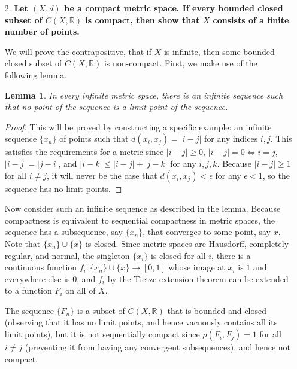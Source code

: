 \documentclass[a4paper,12pt]{article}
\newtheorem{lemma}[theorem]{Lemma}
\begin{document}
\begin{enumerate}
    \item[2.]
        \boldmath\textbf{Let $(X, d)$ be a compact metric space. If every bounded closed subset of $C(X, \mathbb{R})$ is compact, then show that $X$ consists of a finite number of points.
        }\unboldmath \par
        We will prove the contrapositive, that if $X$ is infinite, then some bounded closed subset of $C(X, \mathbb{R})$ is non-compact. First, we make use of the following lemma.
        \begin{lemma}
            In every infinite metric space, there is an infinite sequence such that no point of the sequence is a limit point of the sequence.
        \end{lemma}
        \begin{proof}
            This will be proved by constructing a specific example: an infinite sequence $\{ x_n \}$ of points such that $d(x_i, x_j) = |i - j|$ for any indices $i, j$. This satisfies the requirements for a metric since $|i - j| \geq 0$, $|i - j| = 0 \Leftrightarrow i = j$, $|i - j| = |j - i|$, and $|i - k| \leq |i - j| + |j - k|$ for any $i, j, k$. Because $|i - j| \geq 1$ for all $i \neq j$, it will never be the case that $d(x_i, x_j) < \epsilon$ for any $\epsilon < 1$, so the sequence has no limit points.
        \end{proof}
        Now consider such an infinite sequence as described in the lemma. Because compactness is equivalent to sequential compactness in metric spaces, the sequence has a subsequence, say $\{x_n\}$, that converges to some point, say $x$. Note that $\{x_n\} \cup \{x\}$ is closed. Since metric spaces are Hausdorff, completely regular, and normal, the singleton $\{x_i\}$ is closed for all $i$, there is a continuous function $f_i : \{x_n\} \cup \{x\} \to [0, 1]$ whose image at $x_i$ is $1$ and everywhere else is $0$, and $f_i$ by the Tietze extension theorem can be extended to a function $F_i$ on all of $X$. \par
        The sequence $\{F_n\}$ is a subset of $C(X, \mathbb{R})$ that is bounded and closed (observing that it has no limit points, and hence vacuously contains all its limit points), but it is not sequentially compact since $\rho(F_i, F_j) = 1$ for all $i \neq j$ (preventing it from having any convergent subsequences), and hence not compact.


\end{enumerate}
\end{document}
